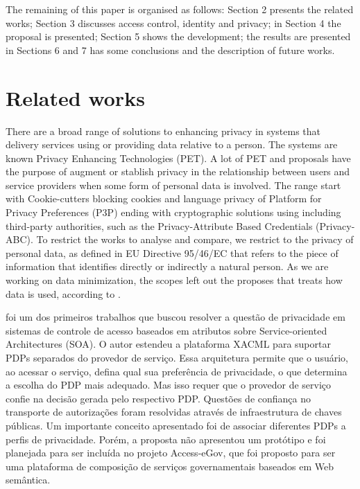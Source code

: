 \documentclass{doublecol-new}
\begin{document}
The remaining of this paper is organised as follows: Section 2 presents the related works; Section 3 discusses access control, identity and privacy; in Section 4 the proposal is presented; Section 5 shows the development; the results are
presented in Sections 6 and 7 has some conclusions and the description of future works.

\section{Related works}
There are a broad range of solutions to enhancing privacy in systems that delivery services using or providing data relative to a person. The systems are known Privacy Enhancing Technologies (PET). A lot of PET and proposals have the purpose of augment or stablish privacy in the relationship between users and service providers when some form of personal data is involved. The range start with Cookie-cutters blocking cookies and language privacy of Platform for Privacy Preferences (P3P) ending with cryptographic solutions using including third-party authorities, such as the Privacy-Attribute Based Credentials (Privacy-ABC). To restrict the works to analyse and compare, we restrict to the privacy of personal data, as defined in EU Directive 95/46/EC\cite{directive199595} that refers to the piece of information that identifies directly or indirectly a natural person. As we are working on data minimization, the scopes left out the proposes that treats how data is used, according to \citep{mondal2014beyond}.

\citep{kolter2007privacy} foi um dos primeiros trabalhos que buscou resolver a questão de privacidade em sistemas de controle de acesso baseados em atributos sobre Service-oriented Architectures (SOA). O autor estendeu a plataforma XACML para suportar PDPs separados do provedor de serviço. Essa arquitetura permite que o usuário, ao acessar o serviço, defina qual sua preferência de privacidade, o que determina a escolha do PDP mais adequado. Mas isso requer que o provedor de serviço confie na decisão gerada pelo respectivo PDP. Questões de confiança no transporte de autorizações foram resolvidas através de infraestrutura de chaves públicas. Um importante conceito apresentado foi de associar diferentes PDPs a perfis de privacidade. Porém, a proposta não apresentou um protótipo e foi planejada para ser incluída no projeto Access-eGov\cite{pernulAccesseGov}, que foi proposto para ser uma plataforma de composição de serviços governamentais baseados em Web semântica.
\end{document}
